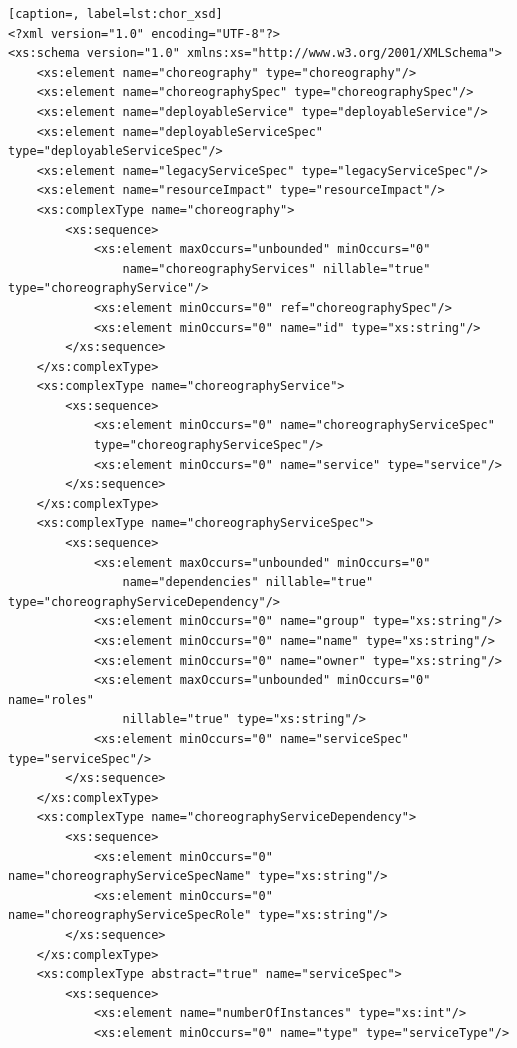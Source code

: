 \documentclass[a4paper, 10pt]{article}
\begin{document}
{\footnotesize

\lstset{language=XML}

\begin{lstlisting}[caption=, label=lst:chor_xsd]
<?xml version="1.0" encoding="UTF-8"?>
<xs:schema version="1.0" xmlns:xs="http://www.w3.org/2001/XMLSchema">
    <xs:element name="choreography" type="choreography"/>
    <xs:element name="choreographySpec" type="choreographySpec"/>
    <xs:element name="deployableService" type="deployableService"/>
    <xs:element name="deployableServiceSpec" type="deployableServiceSpec"/>
    <xs:element name="legacyServiceSpec" type="legacyServiceSpec"/>
    <xs:element name="resourceImpact" type="resourceImpact"/>
    <xs:complexType name="choreography">
        <xs:sequence>
            <xs:element maxOccurs="unbounded" minOccurs="0"
                name="choreographyServices" nillable="true" type="choreographyService"/>
            <xs:element minOccurs="0" ref="choreographySpec"/>
            <xs:element minOccurs="0" name="id" type="xs:string"/>
        </xs:sequence>
    </xs:complexType>
    <xs:complexType name="choreographyService">
        <xs:sequence>
            <xs:element minOccurs="0" name="choreographyServiceSpec" 
            type="choreographyServiceSpec"/>
            <xs:element minOccurs="0" name="service" type="service"/>
        </xs:sequence>
    </xs:complexType>
    <xs:complexType name="choreographyServiceSpec">
        <xs:sequence>
            <xs:element maxOccurs="unbounded" minOccurs="0"
                name="dependencies" nillable="true" type="choreographyServiceDependency"/>
            <xs:element minOccurs="0" name="group" type="xs:string"/>
            <xs:element minOccurs="0" name="name" type="xs:string"/>
            <xs:element minOccurs="0" name="owner" type="xs:string"/>
            <xs:element maxOccurs="unbounded" minOccurs="0" name="roles"
                nillable="true" type="xs:string"/>
            <xs:element minOccurs="0" name="serviceSpec" type="serviceSpec"/>
        </xs:sequence>
    </xs:complexType>
    <xs:complexType name="choreographyServiceDependency">
        <xs:sequence>
            <xs:element minOccurs="0" name="choreographyServiceSpecName" type="xs:string"/>
            <xs:element minOccurs="0" name="choreographyServiceSpecRole" type="xs:string"/>
        </xs:sequence>
    </xs:complexType>
    <xs:complexType abstract="true" name="serviceSpec">
        <xs:sequence>
            <xs:element name="numberOfInstances" type="xs:int"/>
            <xs:element minOccurs="0" name="type" type="serviceType"/>

\end{lstlisting}}
\end{document}
